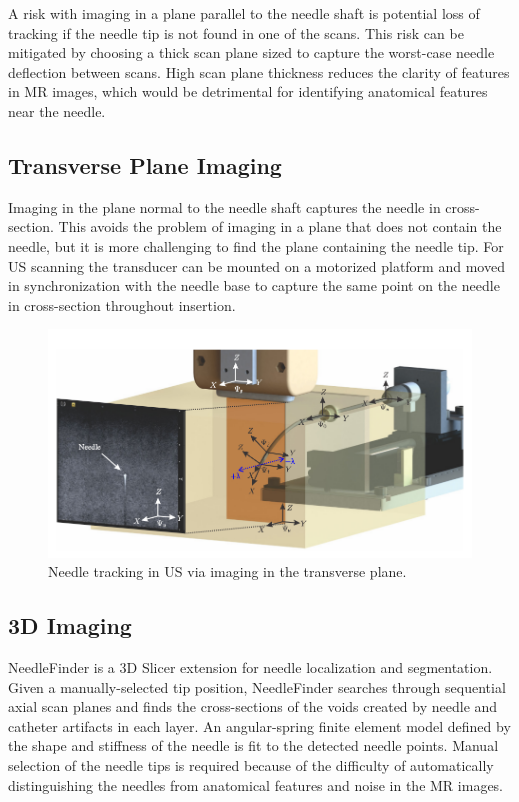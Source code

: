 A risk with imaging in a plane parallel to the needle shaft is potential loss of tracking if the needle tip is not found in one of the scans. This risk can be mitigated by choosing a thick scan plane sized to capture the worst-case needle deflection between scans. High scan plane thickness reduces the clarity of features in MR images, which would be detrimental for identifying anatomical features near the needle.


\subsection{Transverse Plane Imaging}
Imaging in the plane normal to the needle shaft captures the needle in cross-section. This avoids the problem of imaging in a plane that does not contain the needle, but it is more challenging to find the plane containing the needle tip. For US scanning the transducer can be mounted on a motorized platform and moved in synchronization with the needle base to capture the same point on the needle in cross-section throughout insertion\cite{carriere_needle_2015,rossa_adaptive_2016}.

\begin{figure}[h]
\includegraphics[width=1.0\textwidth]{Fig/chap2/vrooijink_US_tracking.png}
\caption{Needle tracking in US via imaging in the transverse plane\cite{vrooijink_needle_2014}.}
\label{fig:transverse_planes_us}
\end{figure}

\subsection{3D Imaging}
NeedleFinder is a 3D Slicer extension for needle localization and segmentation\cite{pernelle_validation_2013}. Given a manually-selected tip position, NeedleFinder searches through sequential axial scan planes and finds the cross-sections of the voids created by needle and catheter artifacts in each layer. An angular-spring finite element model defined by the shape and stiffness of the needle is fit to the detected needle points. Manual selection of the needle tips is required because of the difficulty of automatically distinguishing the needles from anatomical features and noise in the MR images.

